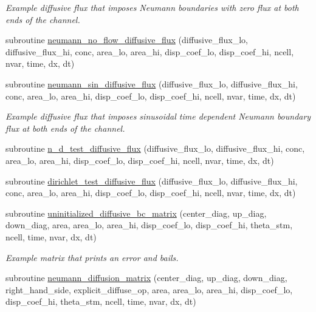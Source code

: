 \begin{CompactItemize}
\begin{CompactList}\small\item\em Example diffusive flux that imposes Neumann boundaries with zero flux at both ends of the channel. \item\end{CompactList}\item 
subroutine \hyperlink{a00054_02070fde3498e9ffef285f98f6648fb7}{neumann\_\-no\_\-flow\_\-diffusive\_\-flux} (diffusive\_\-flux\_\-lo, diffusive\_\-flux\_\-hi, conc, area\_\-lo, area\_\-hi, disp\_\-coef\_\-lo, disp\_\-coef\_\-hi, ncell, nvar, time, dx, dt)
\item 
subroutine \hyperlink{a00054_761524f42d40b0d8f256c660648a1b6d}{neumann\_\-sin\_\-diffusive\_\-flux} (diffusive\_\-flux\_\-lo, diffusive\_\-flux\_\-hi, conc, area\_\-lo, area\_\-hi, disp\_\-coef\_\-lo, disp\_\-coef\_\-hi, ncell, nvar, time, dx, dt)
\begin{CompactList}\small\item\em Example diffusive flux that imposes sinusoidal time dependent Neumann boundary flux at both ends of the channel. \item\end{CompactList}\item 
subroutine \hyperlink{a00054_a9e96b1c553b05d9fc8c3ee7645844bf}{n\_\-d\_\-test\_\-diffusive\_\-flux} (diffusive\_\-flux\_\-lo, diffusive\_\-flux\_\-hi, conc, area\_\-lo, area\_\-hi, disp\_\-coef\_\-lo, disp\_\-coef\_\-hi, ncell, nvar, time, dx, dt)
\item 
subroutine \hyperlink{a00054_3c1cb08501bda433a77faf26955c3886}{dirichlet\_\-test\_\-diffusive\_\-flux} (diffusive\_\-flux\_\-lo, diffusive\_\-flux\_\-hi, conc, area\_\-lo, area\_\-hi, disp\_\-coef\_\-lo, disp\_\-coef\_\-hi, ncell, nvar, time, dx, dt)
\item 
subroutine \hyperlink{a00054_6a67899a1c3944d943a1b2fb5aac2986}{uninitialized\_\-diffusive\_\-bc\_\-matrix} (center\_\-diag, up\_\-diag, down\_\-diag, area, area\_\-lo, area\_\-hi, disp\_\-coef\_\-lo, disp\_\-coef\_\-hi, theta\_\-stm, ncell, time, nvar, dx, dt)
\begin{CompactList}\small\item\em Example matrix that prints an error and bails. \item\end{CompactList}\item 
subroutine \hyperlink{a00054_3bf42416cc949b15affaa511e12c323c}{neumann\_\-diffusion\_\-matrix} (center\_\-diag, up\_\-diag, down\_\-diag, right\_\-hand\_\-side, explicit\_\-diffuse\_\-op, area, area\_\-lo, area\_\-hi, disp\_\-coef\_\-lo, disp\_\-coef\_\-hi, theta\_\-stm, ncell, time, nvar, dx, dt)

\end{CompactItemize}
